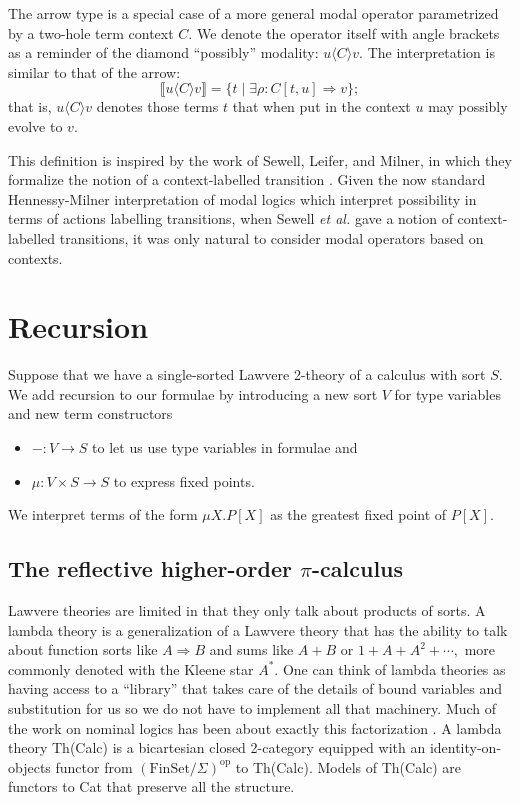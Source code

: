 \documentclass{llncs}
\newcommand{\interp}[1]{\llbracket #1 \rrbracket}
\newcommand{\maps}{\colon}
\newcommand{\FinSet}{\mathrm{FinSet}}
\newcommand{\op}{\mathrm{op}}
\begin{document}
The arrow type is a special case of a more general modal operator parametrized by a two-hole term context $C.$  We denote the operator itself with angle brackets as a reminder of the diamond ``possibly'' modality: $u \langle C \rangle v.$  The interpretation is similar to that of the arrow:
\[ \interp{u \langle C\rangle v} = \{ t \;|\; \exists \rho\maps C[t, u] \Rightarrow v \}; \]
that is, $u \langle C\rangle v$ denotes those terms $t$ that when put
in the context $u$ may possibly evolve to $v.$

This definition is inspired by the work of Sewell, Leifer, and Milner, in which they formalize the notion of a context-labelled transition \cite{DBLP:conf/concur/LeiferM00}.  Given the now standard Hennessy-Milner interpretation of modal logics which interpret possibility in terms of actions labelling transitions, when Sewell {\em et al.} gave a notion of context-labelled transitions, it was only natural
to consider modal operators based on contexts.

\section{Recursion}

Suppose that we have a single-sorted Lawvere 2-theory of a calculus with sort $S$.  We add recursion to our formulae by introducing a new sort $V$ for type variables and new term constructors 
\begin{itemize}
  \item $- \maps V \to S$ to let us use type variables in formulae and
  \item $\mu\maps V\times S \to S$ to express fixed points.
\end{itemize}

We interpret terms of the form $\mu X.P[X]$ as the greatest fixed point of $P[X].$

\subsection{The reflective higher-order $\pi$-calculus}

Lawvere theories are limited in that they only talk about products of sorts.  A lambda theory is a generalization of a Lawvere theory that has the ability to talk about function sorts like $A \Rightarrow B$ and sums like $A+B$ or $1 + A + A^2 + \cdots,$ more commonly denoted with the Kleene star $A^*.$  One can think of lambda theories as having access to a ``library'' that takes care of the details of bound variables and substitution for us so we do not have to implement all that machinery.  Much of the work on nominal logics has been about exactly this factorization \cite{GabbayMJ:picfm}.  A lambda theory Th(Calc) is a bicartesian closed 2-category equipped with an identity-on-objects functor from $(\FinSet/\Sigma)^{\op}$ to Th(Calc).  Models of Th(Calc) are functors to Cat that preserve all the structure.
\end{document}
